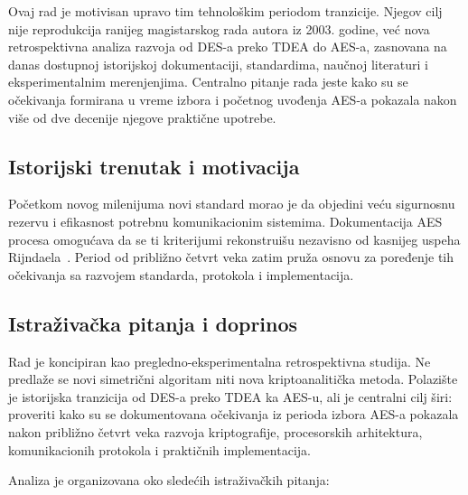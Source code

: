 Ovaj rad je motivisan upravo tim tehnološkim periodom tranzicije.
Njegov cilj nije reprodukcija ranijeg magistarskog rada autora iz
2003. godine, već nova retrospektivna analiza razvoja od DES-a preko
TDEA do AES-a, zasnovana na danas dostupnoj istorijskoj
dokumentaciji, standardima, naučnoj literaturi i eksperimentalnim
merenjenjima. Centralno pitanje rada jeste kako su se očekivanja
formirana u vreme izbora i početnog uvođenja AES-a pokazala nakon više
od dve decenije njegove praktične upotrebe.


\subsection{Istorijski trenutak i motivacija}
\label{subsec:istorijski_trenutak}

Početkom novog milenijuma novi standard morao je da objedini veću
sigurnosnu rezervu i efikasnost potrebnu komunikacionim sistemima.
Dokumentacija AES procesa omogućava da se ti kriterijumi rekonstruišu
nezavisno od kasnijeg uspeha Rijndaela~\cite{nist-aes-report-2001}.
Period od približno četvrt veka zatim pruža osnovu za poređenje tih
očekivanja sa razvojem standarda, protokola i implementacija.

\subsection{Istraživačka pitanja i doprinos}
\label{subsec:istrazivacka_pitanja}

Rad je koncipiran kao pregledno-eksperimentalna retrospektivna studija.
Ne predlaže se novi simetrični algoritam niti nova kriptoanalitička
metoda. Polazište je istorijska tranzicija od DES-a preko TDEA ka AES-u,
ali je centralni cilj širi: proveriti kako su se dokumentovana očekivanja
iz perioda izbora AES-a pokazala nakon približno četvrt veka razvoja
kriptografije, procesorskih arhitektura, komunikacionih protokola i
praktičnih implementacija.

Analiza je organizovana oko sledećih istraživačkih pitanja:

